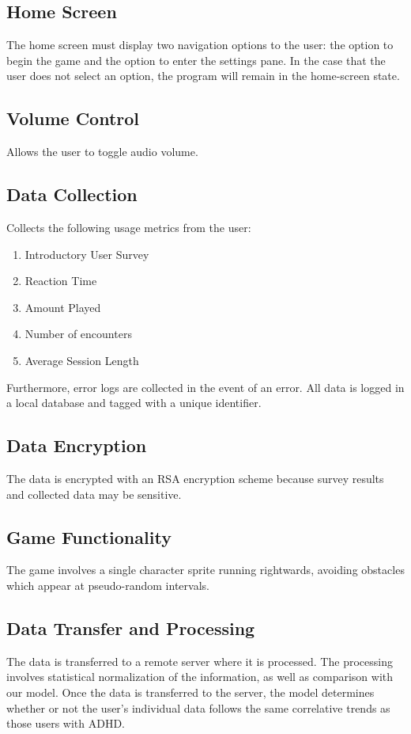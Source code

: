 \documentclass[a4wide]{article}
\begin{document}
\subsection{Home Screen}
The home screen must display two navigation options to the user: the option to
begin the game and the option to enter the settings pane. In the case that the
user does not select an option, the program will remain in the home-screen
state.

\subsection{Volume Control}
Allows the user to toggle audio volume.

\subsection{Data Collection}
Collects the following usage metrics from the user:
\begin{enumerate}
\item Introductory User Survey
\item Reaction Time
\item Amount Played
\item Number of encounters
\item Average Session Length
\end{enumerate}

Furthermore, error logs are collected in the event of an error. All data is
logged in a local database and tagged with a unique identifier.

\subsection{Data Encryption}
The data is encrypted with an RSA encryption scheme because survey results and
collected data may be sensitive.

\subsection{Game Functionality}
The game involves a single character sprite running rightwards, avoiding
obstacles which appear at pseudo-random intervals.

\subsection{Data Transfer and Processing}
The data is transferred to a remote server where it is processed. The processing
involves statistical normalization of the information, as well as comparison
with our model. Once the data is transferred to the server, the model determines
whether or not the user's individual data follows the same correlative trends as
those users with ADHD.
\end{document}
